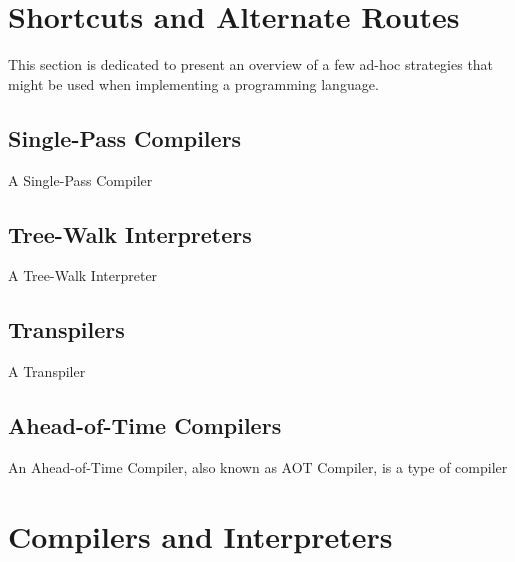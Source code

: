 \section{Shortcuts and Alternate Routes}
This section is dedicated to present an overview of a few ad-hoc strategies that might be used when implementing a programming language.

\subsection{Single-Pass Compilers}
A Single-Pass Compiler
\subsection{Tree-Walk Interpreters}
A Tree-Walk Interpreter

\subsection{Transpilers}
A Transpiler

\subsection{Ahead-of-Time Compilers}
An Ahead-of-Time Compiler, also known as AOT Compiler, is a type of compiler

\section{Compilers and Interpreters}

